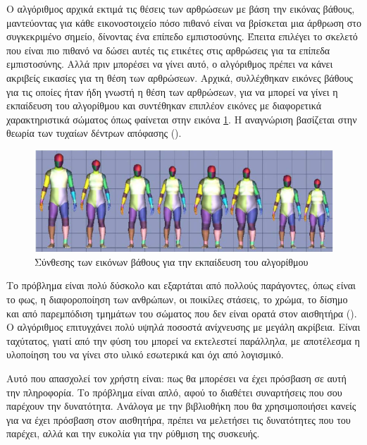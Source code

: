 Ο αλγόριθμος αρχικά εκτιμά τις θέσεις των αρθρώσεων με βάση την εικόνας βάθους, μαντεύοντας για κάθε εικονοστοιχείο πόσο πιθανό είναι να βρίσκεται μια άρθρωση στο συγκεκριμένο σημείο, δίνοντας ένα επίπεδο εμπιστοσύνης. Έπειτα επιλέγει το σκελετό που είναι πιο πιθανό να δώσει αυτές τις ετικέτες στις αρθρώσεις για τα επίπεδα εμπιστοσύνης. Αλλά πριν μπορέσει να γίνει αυτό, ο αλγόριθμος πρέπει να κάνει ακριβείς εικασίες για τη θέση των αρθρώσεων. Αρχικά, συλλέχθηκαν εικόνες βάθους για τις οποίες ήταν ήδη γνωστή η θέση των αρθρώσεων, για να μπορεί να γίνει η εκπαίδευση του αλγορίθμου και συντέθηκαν επιπλέον εικόνες με διαφορετικά χαρακτηριστικά σώματος όπως φαίνεται στην εικόνα \ref{fig:kinect-data-synthesis}. Η αναγνώριση βασίζεται στην θεωρία των τυχαίων δέντρων απόφασης ().

\begin{figure}[H]
    \centering
    \includegraphics[width=.9\textwidth]{kinect/fig/kinect-data-synthesis.png}
    \caption{Σύνθεσης των εικόνων βάθους για την εκπαίδευση του αλγορίθμου\protect\footnotemark}
    \label{fig:kinect-data-synthesis}
\end{figure}

Το πρόβλημα είναι πολύ δύσκολο και εξαρτάται από πολλούς παράγοντες, όπως είναι το φως, η διαφοροποίηση των ανθρώπων, οι ποικίλες στάσεις, το χρώμα, το δίσημο και από παρεμπόδιση τμημάτων του σώματος που δεν είναι ορατά στον αισθητήρα (). Ο αλγόριθμος επιτυγχάνει πολύ υψηλά ποσοστά ανίχνευσης με μεγάλη ακρίβεια. Είναι ταχύτατος, γιατί από την φύση του μπορεί να εκτελεστεί παράλληλα, με αποτέλεσμα η υλοποίηση του να γίνει στο υλικό εσωτερικά και όχι από λογισμικό.

Αυτό που απασχολεί τον χρήστη είναι: πως θα μπορέσει να έχει πρόσβαση σε αυτή την πληροφορία. Το πρόβλημα είναι απλό, αφού το  διαθέτει συναρτήσεις που σου παρέχουν την δυνατότητα. Ανάλογα με την βιβλιοθήκη που θα χρησιμοποιήσει κανείς για να έχει πρόσβαση στον αισθητήρα, πρέπει να μελετήσει τις δυνατότητες που του παρέχει, αλλά και την ευκολία για την ρύθμιση της συσκευής.

